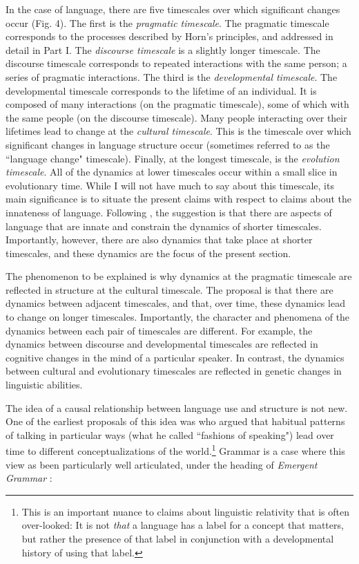 \documentclass[man, noapacite, 12pt]{apa2}
\begin{document}
In the case of language,  there are five timescales over which significant changes occur (Fig. 4). The first is the {\it pragmatic timescale}. The pragmatic timescale corresponds to the processes described by Horn's principles, and addressed in detail in Part I. The {\it discourse timescale} is a slightly longer timescale. The discourse timescale corresponds to repeated interactions with the same person; a series of pragmatic interactions. The third is the {\it developmental timescale}. The developmental timescale corresponds to the lifetime of an individual. It is composed of many interactions (on the pragmatic timescale), some of which with the same people (on the discourse timescale).  Many people interacting over their lifetimes lead to change at the {\it cultural timescale}. This is the timescale over which significant changes in language structure  occur (sometimes referred to as the ``language change" timescale). Finally, at the longest timescale, is the {\it evolution timescale}. All of the dynamics at lower timescales occur within a small slice in evolutionary time. While I will not have much to say about this timescale, its main significance is to situate the present claims with respect to claims about the innateness of language. Following , the suggestion is that there are aspects of language that are innate and constrain the dynamics of shorter timescales. Importantly, however, there are also  dynamics that take place at  shorter timescales, and these dynamics are the focus of the present section.

The phenomenon to be explained is why dynamics at the pragmatic timescale are reflected in structure at the cultural timescale. The proposal is that there are dynamics between adjacent timescales, and that, over time, these dynamics lead to change on longer timescales. Importantly, the character and phenomena of the dynamics between each pair of timescales are different. For example,  the dynamics between discourse and developmental timescales are reflected in cognitive changes in the mind of a particular speaker. In contrast, the dynamics between cultural and evolutionary timescales are reflected in genetic changes in linguistic abilities.

The idea of a causal relationship between language use and structure is not new. One of the earliest proposals of this idea was  who argued that habitual patterns of talking in particular ways (what he called ``fashions of speaking") lead over time to different conceptualizations of the world.\footnote{This is an important nuance to claims about linguistic relativity that is often over-looked: It is not {\it that} a language has a label for a concept that matters,  but rather the presence of that label in conjunction with a developmental history of using that label.} Grammar is a case where this view as been particularly well articulated, under the heading of {\it Emergent Grammar} \cite{hopper1987emergent}: 
\end{document}
